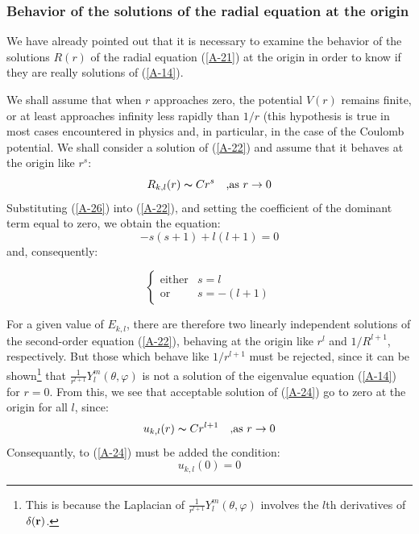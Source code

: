\subsubsection{Behavior of the solutions of the radial equation at the origin}\label{sec:A-2-c}
We have already pointed out that it is necessary to examine the behavior of the solutions $R(r)$ of the radial equation (\ref{A-21}) at the origin in order to know if they are really solutions of (\ref{A-14}).

We shall assume that when $r$ approaches zero, the potential $V(r)$ remains finite, or at least approaches infinity less rapidly than $1/r$ (this hypothesis is true in most cases encountered in physics and, in particular, in the case of the Coulomb potential. We shall consider a solution of (\ref{A-22}) and assume that it behaves at the origin like $r^s$:
\begin{equation}\label{A-26}
	R_{k,l}(r)\thicksim Cr^s\quad \mbox{,as } r\to 0
\end{equation}
Substituting (\ref{A-26}) into (\ref{A-22}), and setting the coefficient of the dominant term equal to zero, we obtain the equation:
\begin{equation}
	-s(s+1) + l(l+1)=0
\end{equation}
and, consequently:

\begin{equation}\label{A-28}
	\left \{
		\begin{array}{ccc}
			\mbox{either} & s=l\\
			\mbox{or}  & s=-(l+1)
		\end{array}
	\right.
\end{equation}

For a given value of $E_{k,l}$, there are therefore two linearly independent solutions of the second-order equation (\ref{A-22}), behaving at the origin like $r^l$ and $1/R^{l+1}$, respectively. But those which behave like $1/r^{l+1}$ must be rejected, since it can be shown\footnote{This is because the Laplacian of $\frac{1}{r^{l+1}}Y_l^m(\theta,\varphi)$ involves the $l$th derivatives of $\delta(\vb{r})$.} that $\frac{1}{r^{l+1}}Y_l^m(\theta,\varphi)$ is not a solution of the eigenvalue equation (\ref{A-14}) for $r=0$. From this, we see that acceptable solution of (\ref{A-24}) go to zero at the origin for all $l$, since:
\begin{equation}\label{A-29}
	u_{k,l}(r)\thicksim Cr^{l+1}\quad  \mbox{,as } r\to 0
\end{equation}
Consequantly, to (\ref{A-24}) must be added the condition:
\begin{equation}\label{A-30}
	\boxed{u_{k,l}(0)=0}
\end{equation}

